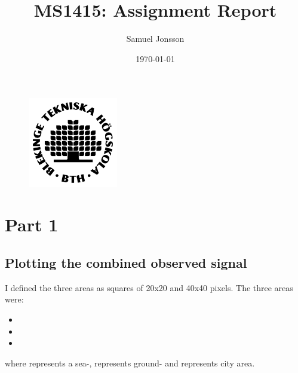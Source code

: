 \documentclass[12pt,a4paper,twoside]{article}
\author{Samuel Jonsson}
\date{\today}
\title{MS1415: Assignment Report}
\begin{document}
\maketitle

\begin{figure}[!b]
    \centering
    \includegraphics[width = 0.35\textwidth]{img/BTH_logo_black.png}
\end{figure}

\newpage

\section{Part 1}
\subsection{Plotting the combined observed signal}
\label{ssec:observedsignal}

I defined the three areas as squares of 20x20 and 40x40 pixels. The three areas were:

\begin{itemize}
    \item {}
    \item {}
    \item {}
\end{itemize}    
where  represents a sea-,  represents ground- and  represents city area.
\end{document}
